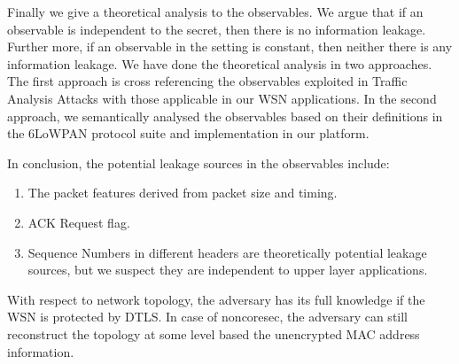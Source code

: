 Finally we give a theoretical analysis to the observables. We argue that if an observable is independent to the secret, then there is no information leakage. Further more, if an observable in the setting is constant, then neither there is any information leakage. We have done the theoretical analysis in two approaches. The first approach is cross referencing the observables exploited in Traffic Analysis Attacks with those applicable in our WSN applications. In the second approach, we semantically analysed the observables based on their definitions in the 6LoWPAN protocol suite and implementation in our platform. 

In conclusion, the potential leakage sources in the observables include:
\begin{enumerate}
	\item The packet features derived from packet size and timing.
	\item ACK Request flag.
	\item Sequence Numbers in different headers are theoretically potential leakage sources, but we suspect they are independent to upper layer applications.
\end{enumerate}

With respect to network topology, the adversary has its full knowledge if the WSN is protected by DTLS. In case of noncoresec, the adversary can still reconstruct the topology at some level based the unencrypted MAC address information. 